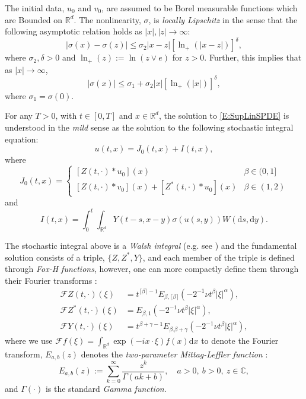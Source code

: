 \documentclass[a4paper,11pt]{article}
\numberwithin{equation}{section}
\theoremstyle{plain}
\theoremstyle{definition}
\newcommand{\ud}{\ensuremath{\mathrm{d} }}
\newcommand{\R}{\mathbb{R}}
\numberwithin{NQ}{section}
\numberwithin{LQ}{section}
\numberwithin{ZQ}{section}
\begin{document}
  The initial data, $u_0$ and $v_0$, are assumed to be Borel measurable functions which are Bounded
  on $\R^d$. The nonlinearity, $\sigma$, is {\em locally Lipschitz} in the sense that the following
  asymptotic relation holds as $|x|,|z| \to \infty$:
	\begin{equation} \label{C:SigSupLin}
    |\sigma(x)-\sigma(z)| \le \sigma_2|x-z|[\ln_+(|x-z|)]^{\delta},
	\end{equation}
  where $\sigma_2 , \delta >0$ and $\ln_+(z) := \ln(z \vee e)$ for $z >0$. Further, this implies
  that as $|x| \to \infty$,
	\begin{equation}
    |\sigma(x)| \le \sigma_1 + \sigma_2|x|[\ln_+(|x|)]^{\delta},
	\end{equation}
  where $\sigma_1 = \sigma(0)$.

  For any $T>0$, with $t \in [0,T]$ and $x \in \R^d$, the solution to \eqref{E:SupLinSPDE} is
  understood in the {\em mild} sense as the solution to the following stochastic integral equation:
  \[
  u(t,x) = J_0(t,x) + I(t,x),
  \]
  where
	\[
    J_0(t,x) =\begin{cases}
    [Z(t,\cdot)*u_0](x) & \beta \in (0,1]
    \\	[Z(t,\cdot)*v_0](x) + [Z^*(t,\cdot)*u_0](x) & \beta \in (1,2)
    \end{cases}
	\]
  and
	\[
    I(t,x) = \int_0^t \int_{\R^d} Y(t-s,x-y)\sigma(u(s,y)) W(\ud s, \ud y).
	\]

  The stochastic integral above is a {\em Walsh integral} (e.g. see \cite{walsh:86:introduction})
  and the fundamental solution consists of a triple, $\{Z, Z^*, Y\}$, and each member of the triple
  is defined through {\em Fox-H functions}, however, one can more compactly define them through
  their Fourier transforms \cite[Theorem 4.1]{chen.hu.ea:19:nonlinear}:
	\begin{align*}
		\mathcal{F}Z(t,\cdot)(\xi)   & = t^{\lceil \beta \rceil -1} E_{\beta, \lceil \beta \rceil}\left(-2^{-1} \nu t^\beta |\xi|^{\alpha}\right), \\
		\mathcal{F}Z^*(t,\cdot)(\xi) & = E_{\beta, 1}\left(-2^{-1} \nu t^\beta |\xi|^{\alpha}\right),                                              \\
		\mathcal{F}Y(t,\cdot)(\xi)   & = t^{\beta + \gamma-1}E_{\beta. \beta +\gamma}\left(-2^{-1}\nu t^\beta |\xi|^\alpha\right),
	\end{align*}
  where we use $\mathcal{F}f(\xi) = \int_{\R^d} \exp(-i x \cdot \xi) f(x) \ud x$ to denote the
  Fourier transform, $E_{a, b}(z)$ denotes the {\em two-parameter Mittag-Leffler function}
  \cite{podlubny:99:fractional}:
	\[
		E_{a,b}(z) := \sum_{k=0}^{\infty} \frac{z^k}{\Gamma(ak+b)}, \quad a>0, \: b>0, \: z \in \mathbb{C},
	\]
and $\Gamma(\cdot)$ is the standard {\em Gamma function}.
\end{document}
